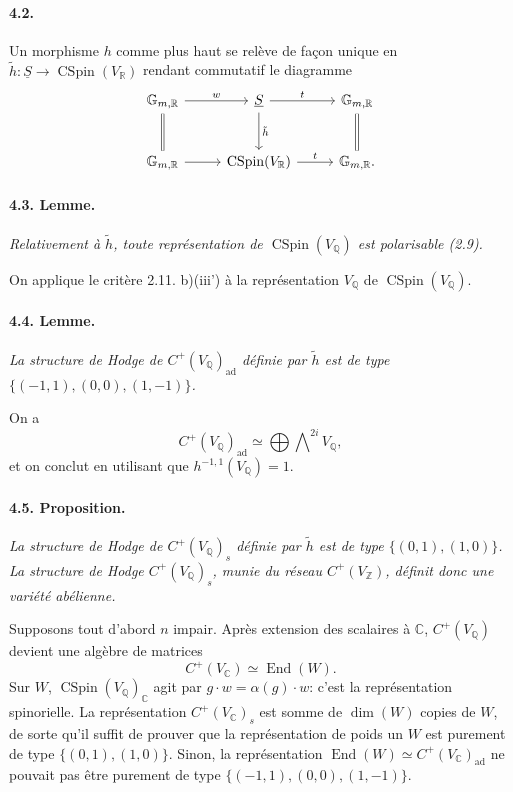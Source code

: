 \documentclass[10pt,leqno]{article}
\newcommand{\C}{\mathbb{C}}
\newcommand{\Q}{\mathbb{Q}}
\newcommand{\R}{\mathbb{R}}
\newcommand{\Z}{\mathbb{Z}}
\newcommand{\End}{\operatorname{End}}
\newcommand{\CSpin}{\operatorname{CSpin}}
\newcommand{\ad}{\operatorname{ad}}
\begin{document}
\paragraph{4.2.} Un morphisme $h$ comme plus haut se relève de façon unique en $\tilde h:\underline S\to\CSpin(V_\R)$ rendant commutatif le diagramme
\[
\begin{tikzcd}[column sep=2.6em,row sep=2.6em]
\mathbb G_{m,\R} \arrow[r,"w"] \arrow[d,equal] & \underline S \arrow[r,"t"] \arrow[d,"\tilde h"] & \mathbb G_{m,\R} \arrow[d,equal]\\
\mathbb G_{m,\R} \arrow[r] & \CSpin(V_\R) \arrow[r,"t"] & \mathbb G_{m,\R}.
\end{tikzcd}
\]

\clearpage

\paragraph{4.3. Lemme.} \emph{Relativement à $\tilde h$, toute représentation de $\CSpin(V_\Q)$ est polarisable (2.9).}

On applique le critère 2.11. b)(iii') à la représentation $V_\Q$ de $\CSpin(V_\Q)$.

\paragraph{4.4. Lemme.} \emph{La structure de Hodge de $C^+(V_\Q)_{\ad}$ définie par $\tilde h$ est de type $\{(-1,1),(0,0),(1,-1)\}$.}

On a
\[
C^+(V_\Q)_{\ad}\simeq\bigoplus\bigwedge\nolimits^{2i}V_\Q,
\]
et on conclut en utilisant que $h^{-1,1}(V_\Q)=1$.

\paragraph{4.5. Proposition.} \emph{La structure de Hodge de $C^+(V_\Q)_s$ définie par $\tilde h$ est de type $\{(0,1),(1,0)\}$. La structure de Hodge $C^+(V_\Q)_s$, munie du réseau $C^+(V_\Z)$, définit donc une variété abélienne.}

Supposons tout d'abord $n$ impair. Après extension des scalaires à $\C$, $C^+(V_\Q)$ devient une algèbre de matrices
\[
C^+(V_\C)\simeq\End(W).
\]
Sur $W$, $\CSpin(V_\Q)_\C$ agit par $g\cdot w=\alpha(g)\cdot w$: c'est la représentation spinorielle. La représentation $C^+(V_\C)_s$ est somme de $\dim(W)$ copies de $W$, de sorte qu'il suffit de prouver que la représentation de poids un $W$ est purement de type $\{(0,1),(1,0)\}$. Sinon, la représentation $\End(W)\simeq C^+(V_\C)_{\ad}$ ne pouvait pas être purement de type $\{(-1,1),(0,0),(1,-1)\}$.
\end{document}

